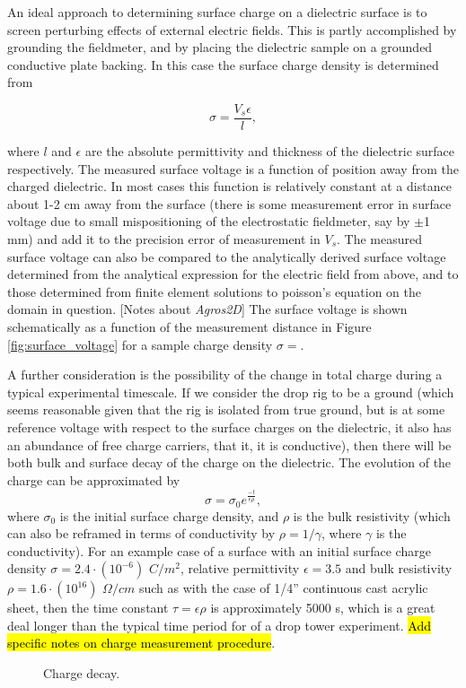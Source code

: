 \documentclass[10pt,a4paper]{article}
\begin{document}
An ideal approach to determining surface charge on a dielectric surface is to screen perturbing effects of external electric fields. This is partly accomplished by grounding the fieldmeter, and by placing the dielectric sample on a grounded conductive plate backing. In this case the surface charge density is determined from

\[ \sigma = \frac{V_s \epsilon}{l}, \]

where $l$ and $\epsilon$ are the absolute permittivity and thickness of the dielectric surface respectively. The measured surface voltage is a function of position away from the charged dielectric. In most cases this function is relatively constant at a distance about 1-2 cm away from the surface (there is some measurement error in surface voltage due to small mispositioning of the electrostatic fieldmeter, say by $\pm$1 mm) and add it to the precision error of measurement in $V_s$. The measured surface voltage can also be compared to the analytically derived surface voltage determined from the analytical expression for the electric field from above, and to those determined from finite element solutions to poisson's equation on the domain in question. [Notes about \emph{Agros2D}] The surface voltage is shown schematically as a function of the measurement distance in Figure \ref{fig:surface_voltage} for a sample charge density $\sigma = $.

A further consideration is the possibility of the change in total charge during a typical experimental timescale. If we consider the drop rig to be a ground (which seems reasonable given that the rig is isolated from true ground, but is at some reference voltage with respect to the surface charges on the dielectric, it also has an abundance of free charge carriers, that it, it is conductive), then there will be both bulk and surface decay of the charge on the dielectric. The evolution of the charge can be approximated by
\[ \sigma = \sigma_0 e^{\frac{-t}{\epsilon \rho}}, \]
where $\sigma_0$ is the initial surface charge density, and $\rho$ is the bulk resistivity (which can also be reframed in terms of conductivity by $\rho = 1/\gamma$, where $\gamma$ is the conductivity). For an example case of a surface with an initial surface charge density $\sigma = 2.4 \cdot (10^{-6})$ $C/m^2$, relative permittivity $\epsilon = 3.5$ and bulk resistivity $\rho = 1.6 \cdot (10^{16})$ $\Omega/cm$ such as with the case of 1/4'' continuous cast acrylic sheet, then the time constant $\tau = \epsilon \rho$ is approximately 5000 s, which is a great deal longer than the typical time period for of a drop tower experiment. \hl{Add specific notes on charge measurement procedure}.

\begin{figure}
    \centering
    
       \caption{Charge decay.\label{fig:charge_decay}}
\end{figure}
\end{document}

